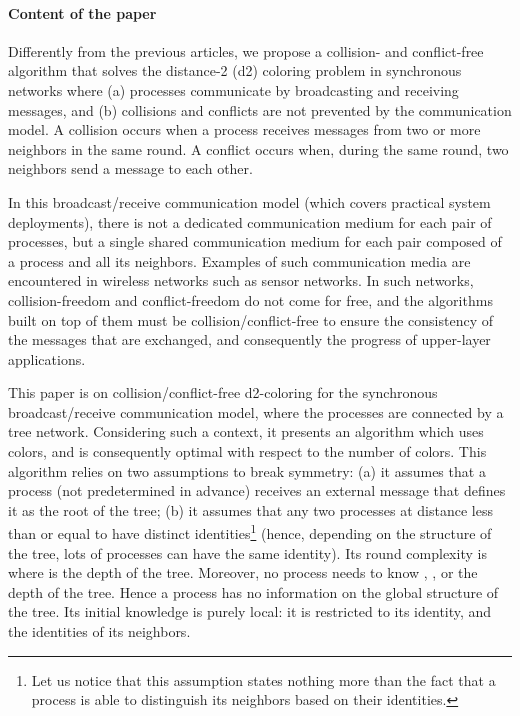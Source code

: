 \documentclass[11pt,english]{article}
\begin{document}
\paragraph{Content of the paper}
Differently from the previous articles, we propose a collision- and
conflict-free algorithm that solves the distance-2 (d2) coloring problem in
synchronous networks where (a) processes communicate by broadcasting
and receiving messages, and (b) collisions and conflicts are not
prevented by the communication model.  A collision occurs when a
process receives messages from two or more neighbors in the same
round. A conflict occurs when, during the same round, two neighbors
send a message to each other.

In this broadcast/receive communication model (which covers practical
system deployments), there is not a dedicated communication medium for
each pair of processes, but a single shared communication medium for
each pair composed of a process and all its neighbors.  Examples of
such communication media are encountered in wireless networks such as
sensor networks. In such networks, collision-freedom and
conflict-freedom do not come for free, and the algorithms built on top
of them must be collision/conflict-free to ensure the consistency of
the messages that are exchanged, and consequently the progress of
upper-layer applications.

This paper is on collision/conflict-free d2-coloring for the
synchronous broadcast/receive communication model, where the processes
are connected by a tree network.  Considering such a context, it
presents an algorithm which uses  colors, and is
consequently optimal with respect to the number of colors. This
algorithm relies on two assumptions to break symmetry: (a) it assumes
that a process (not predetermined in advance) receives an external
message that defines it as the root of the tree; (b) it assumes that
any two processes at distance less than or equal to  have distinct identities\footnote{Let us notice
  that this assumption states nothing more than the fact that a
  process is able to distinguish its neighbors based on their
  identities.} (hence, depending on the structure of the tree, lots of
processes can have the same identity). Its round complexity is
 where  is the depth of the tree. Moreover, no process
needs to know , , or the depth of the tree. Hence a process
has no information on the global structure of the tree.  Its initial
knowledge is purely local: it is restricted to its identity, and the
identities of its neighbors.
\end{document}
